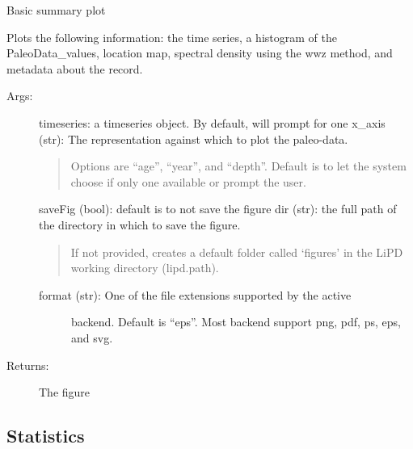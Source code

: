 \documentclass[letterpaper,10pt,english]{sphinxmanual}
\begin{document}
\begin{fulllineitems}
\label{\detokenize{Main:pyleoclim.summaryTs}}
Basic summary plot

Plots the following information: the time series, a histogram of
the PaleoData\_values, location map, spectral density using the wwz 
method, and metadata about the record.
\begin{description}
\item[{Args:}] \leavevmode
timeseries: a timeseries object. By default, will prompt for one
x\_axis (str): The representation against which to plot the paleo-data.
\begin{quote}

Options are “age”, “year”, and “depth”. Default is to let the
system choose if only one available or prompt the user.
\end{quote}

saveFig (bool): default is to not save the figure
dir (str): the full path of the directory in which to save the figure.
\begin{quote}

If not provided, creates a default folder called ‘figures’ in the
LiPD working directory (lipd.path).
\end{quote}
\begin{description}
\item[{format (str): One of the file extensions supported by the active}] \leavevmode
backend. Default is “eps”. Most backend support png, pdf, ps, eps,
and svg.

\end{description}

\item[{Returns:}] \leavevmode
The figure

\end{description}

\end{fulllineitems}



\subsection{Statistics}
\label{\detokenize{Main:statistics}}
\end{document}
